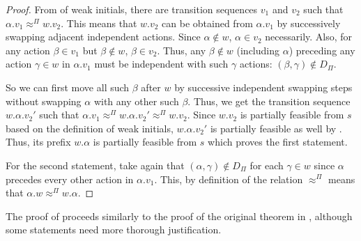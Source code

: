 \documentclass[numbook]{svjour3}
\begin{document}
\begin{proof}
	From  of weak initials, there are transition sequences $v_1$ and $v_2$ such that $\alpha.v_1 \approx^\Pi w.v_2$. This means that $w.v_2$ can be obtained from $\alpha.v_1$ by successively swapping adjacent independent actions. Since $\alpha \notin w$, $\alpha \in v_2$ necessarily. Also, for any action $\beta \in v_1$ but $\beta \notin w$, $\beta \in v_2$. Thus, any $\beta \notin w$ (including $\alpha$) preceding any action $\gamma \in w$ in $\alpha.v_1$ must be independent with such $\gamma$ actions: $(\beta, \gamma) \notin D_\Pi$.
	
	So we can first move all such $\beta$ after $w$ by successive independent swapping steps without swapping $\alpha$ with any other such $\beta$. Thus, we get the transition sequence $w.\alpha.v_2'$ such that $\alpha.v_1 \approx^\Pi w.\alpha.v_2' \approx^\Pi w.v_2$. Since $w.v_2$ is partially feasible from $s$ based on the definition of weak initials, $w.\alpha.v_2'$ is partially feasible as well by . Thus, its prefix $w.\alpha$ is partially feasible from $s$ which proves the first statement.
	
	For the second statement, take again that $(\alpha, \gamma) \notin D_\Pi$ for each $\gamma \in w$ since $\alpha$ precedes every other action in $\alpha.v_1$. This, by definition of the relation $\approx^\Pi$ means that $\alpha.w \approx^\Pi w.\alpha$.
\end{proof}

The proof of  proceeds similarly to the proof of the original theorem in \cite{source_persistent}, although some statements need more thorough justification.
\end{document}
